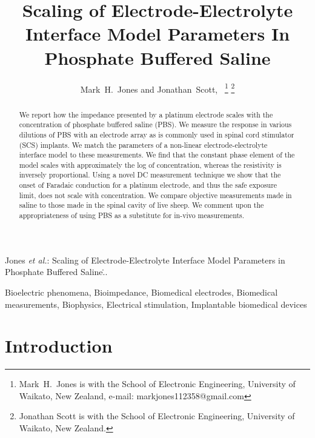 \documentclass[journal, a4paper]{IEEEtran}
\begin{document}
\title{Scaling of Electrode-Electrolyte Interface Model Parameters In Phosphate Buffered Saline}

\author{Mark~H.~Jones and Jonathan~Scott,~
    \thanks{Mark~H.~Jones is with the School of Electronic Engineering, University of Waikato, New Zealand, e-mail: markjones112358@gmail.com}%
\thanks{Jonathan Scott is with the School of Electronic Engineering, University of Waikato, New Zealand.}
}

{Jones \MakeLowercase{\textit{et al.}}: Scaling of Electrode-Electrolyte Interface Model Parameters in Phosphate Buffered Saline\...}
\maketitle



\begin{abstract}
We report how the impedance presented by a platinum electrode scales with the concentration of phosphate buffered saline (PBS).
{
    \color{blue}
    We measure the response in various dilutions of PBS with an electrode array as is commonly used in spinal cord stimulator (SCS) implants. We match the parameters of a non-linear electrode-electrolyte interface model to these measurements.
}
We find that the constant phase element of the model scales with approximately the log of concentration, whereas the resistivity is inversely proportional.
Using a novel DC measurement technique we show that the {\color{blue} onset of Faradaic conduction for} a platinum electrode, and thus the safe exposure limit, does not scale with concentration.
We compare objective measurements made in saline to those made in the spinal cavity of live sheep. We comment upon the appropriateness of using PBS as a substitute for in-vivo measurements.
\end{abstract}

\begin{IEEEkeywords}
    Bioelectric phenomena, Bioimpedance, Biomedical electrodes, Biomedical measurements, Biophysics, Electrical stimulation, Implantable biomedical devices
\end{IEEEkeywords}




\section{Introduction}
\end{document}

